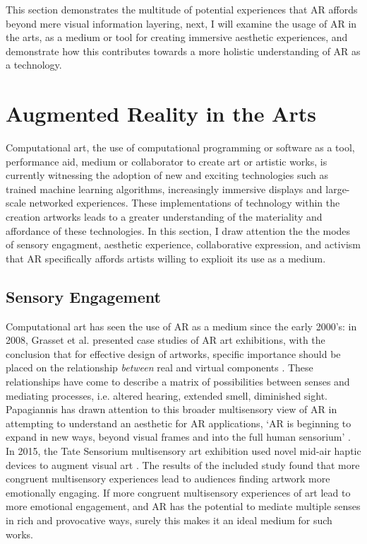  This section demonstrates the multitude of potential experiences that AR affords beyond mere visual information layering, next, I will examine the usage of AR in the arts, as a medium or tool for creating immersive aesthetic experiences, and demonstrate how this contributes towards a more holistic understanding of AR as a technology. 



\section{Augmented Reality in the Arts}\label{sec: ar-arts}
Computational art, the use of computational programming or software as a tool, performance aid, medium or collaborator to create art or artistic works, is currently witnessing the adoption of new and exciting technologies such as trained machine learning algorithms, increasingly immersive displays and large-scale networked experiences. These implementations of technology within the creation artworks leads to a greater understanding of the materiality and affordance of these technologies. In this section, I draw attention the the modes of sensory engagment, aesthetic experience, collaborative expression, and activism that AR specifically affords artists willing to explioit its use as a medium.

\subsection{Sensory Engagement}\label{sec: ar-arts-sensory}
Computational art has seen the use of AR as a medium since the early 2000’s: in 2008, Grasset et al. presented case studies of AR art exhibitions, with the conclusion that for effective design of artworks, specific importance should be placed on the relationship \textit{between} real and virtual components \citeyearpar{grasset2008}. These relationships have come to describe a matrix of possibilities between senses and mediating processes, i.e. altered hearing, extended smell, diminished sight. Papagiannis has drawn attention to this broader multisensory view of AR in attempting to understand an aesthetic for AR applications, `AR is beginning to expand in new ways, beyond visual frames and into the full human sensorium' \citeyearpar{papagiannis2014}. In 2015, the Tate Sensorium multisensory art exhibition used novel mid-air haptic devices to augment visual art \citep{vi2017a}. The results of the included study found that more congruent multisensory experiences lead to audiences finding artwork more emotionally engaging. If more congruent multisensory experiences of art lead to more emotional engagement, and AR has the potential to mediate multiple senses in rich and provocative ways, surely this makes it an ideal medium for such works. 

